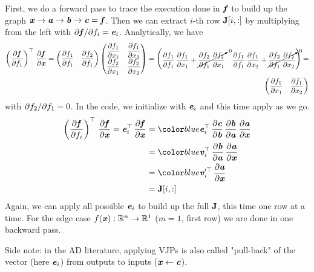 \documentclass[paper=a4,11pt,headsepline]{scrartcl}
\begin{document}
First, we do a forward pass to trace the execution done in $\bm{\mathit{f}}$ to build up
the graph $\bm{\mathit{x}}\rightarrow \bm{\mathit{a}}\rightarrow \bm{\mathit{b}}\rightarrow \bm{\mathit{c}} = \bm{\mathit{f}}$. Then we can extract
$i$-th row $\bm{\mathbf{J}}[i,:]$ by multiplying from the left with $\partial \bm{\mathit{f}}/\partial f_i =
\bm{\mathit{e}}_i$. Analytically, we have
\begin{equation*}
    \begin{split}
    \left(\dfrac{\partial \bm{\mathit{f}}}{\partial f_1}\right)^\top\,\dfrac{\partial \bm{\mathit{f}}}{\partial \bm{\mathit{x}}}
    =
    \begin{pmatrix}
        \dfrac{\partial f_1}{\partial f_1} & \dfrac{\partial f_2}{\partial f_1} \\
    \end{pmatrix}
    \begin{pmatrix}
        \dfrac{\partial f_1}{\partial x_1} & \dfrac{\partial f_1}{\partial x_2} \\
        \dfrac{\partial f_2}{\partial x_1} & \dfrac{\partial f_2}{\partial x_2} \\
    \end{pmatrix}
    =
    \begin{pmatrix}
        \dfrac{\partial f_1}{\partial f_1}\,\dfrac{\partial f_1}{\partial x_1} + \cancelto{0}{\dfrac{\partial f_2}{\partial f_1}\,\dfrac{\partial f_2}{\partial x_1}} &
        \dfrac{\partial f_1}{\partial f_1}\,\dfrac{\partial f_1}{\partial x_2} + \cancelto{0}{\dfrac{\partial f_2}{\partial f_1}\,\dfrac{\partial f_2}{\partial x_2}}
    \end{pmatrix}
    =\\
    \begin{pmatrix}
        \dfrac{\partial f_1}{\partial x_1} & \dfrac{\partial f_1}{\partial x_2}
    \end{pmatrix}
    \end{split}
\end{equation*}
with $\partial f_2/\partial f_1=0$.
In the code, we initialize with $\bm{\mathit{e}}_i$ and this time apply
 as we go.
\begin{align*}
    \left(\pd{\ve f}{f_i}\right)^\top\,\pd{\ve f}{\ve x} = \ve e_i^\top\,\pd{\ve f}{\ve x}
        &= \blue{\ve e_i^\top\,\pd{\ve c}{\ve b}}\,\pd{\ve b}{\ve a}\,\pd{\ve a}{\ve x}\\
        &= \blue{\ve v_i^\top\,\pd{\ve b}{\ve a}}\,\pd{\ve a}{\ve x}\\
        &= \blue{\ve v_i'^\top\,\pd{\ve a}{\ve x}}\\
        &= \ma J[i,:]
\end{align*}
Again, we can apply all possible $\bm{\mathit{e}}_i$ to build up the full $\bm{\mathbf{J}}$, this
time one row at a time. For the edge case $f(\bm{\mathit{x}}): \mathbb R^n \rightarrow \mathbb
R^1$ ($m=1$, first row) we are done in one backward pass.

Side note: in the AD literature, applying VJPs is also called "pull-back" of
the vector (here $\bm{\mathit{e}}_i$) from outputs to inputs ($\bm{\mathit{x}}\leftarrow\bm{\mathit{c}}$).
\end{document}
